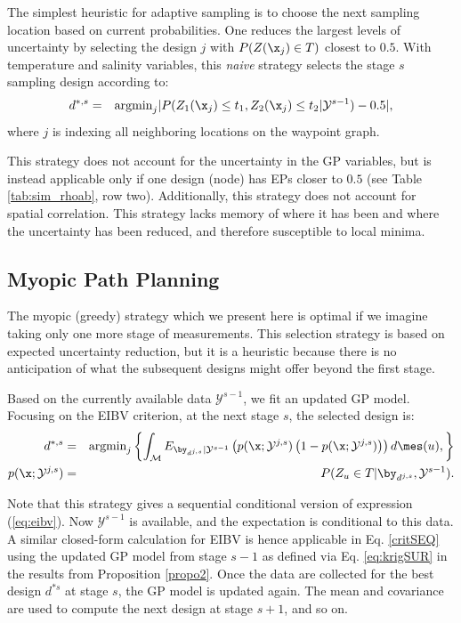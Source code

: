 The simplest heuristic for adaptive sampling is to choose the next
sampling location based on current probabilities. One reduces the
largest levels of uncertainty by selecting the design $j$ with
$P(Z(\x_j) \in T)$ closest to $0.5$.  With temperature and salinity
variables, this {\it{naive}} strategy selects the stage $s$ sampling
design according to:
\begin{eqnarray}\label{critNaive}
    d^{*,s} &=& \mbox{argmin}_{j} |P(Z_1(\x_j) \leq t_1, Z_2(\x_j) \leq t_2 | \mathcal{Y}^{s-1})-0.5|, \nonumber
\end{eqnarray}
where $j$ is indexing all neighboring locations on the waypoint graph.

This strategy does not account for the uncertainty in the GP
variables, but is instead applicable only if one design (node) has EPs
closer to $0.5$ (see Table \ref{tab:sim_rhoab}, row
two). Additionally, this strategy does not account for spatial
correlation. This strategy lacks memory of where it has been and where
the uncertainty has been reduced, and therefore susceptible to local
minima.

\subsection{Myopic Path Planning}
\label{sec:myopic}

The myopic (greedy) strategy which we present here is optimal if we
imagine taking only one more stage of measurements. This selection
strategy is based on expected uncertainty reduction, but it is a
heuristic because there is no anticipation of what the subsequent
designs might offer beyond the first stage.

Based on the currently available data $\mathcal{Y}^{s-1}$, we fit an
updated GP model. Focusing on the EIBV criterion, at the next stage
$s$, the selected design is:
\begin{eqnarray}\label{critSEQ}
    d^{*,s} &=& \mbox{argmin}_{j} \left\{ \int_{\mathcal{M}} E_{\by_{d^{j,s}}|\mathcal{Y}^{s-1}} \left( p(\x;\mathcal{Y}^{j,s})\left( 1-p(\x;\mathcal{Y}^{j,s})\right) \right) d\mes(u), \right\} \\
    p(\x;\mathcal{Y}^{j,s}) &=& P(Z_u \in T |\by_{d^{j,s}},\mathcal{Y}^{s-1}). \nonumber
\end{eqnarray}

Note that this strategy gives a sequential conditional version of
expression (\ref{eq:eibv}). Now $\mathcal{Y}^{s-1}$ is available, and
the expectation is conditional to this data. A similar closed-form
calculation for EIBV is hence applicable in Eq.  \eqref{critSEQ} using the updated
GP model from stage $s-1$ as defined via Eq. \eqref{eq:krigSUR} in the results from Proposition \ref{propo2}. Once the data are collected for the best design $d^{*s}$ at stage $s$, the GP model is updated again. The mean and covariance are used to compute the next design at stage $s+1$, and so on.


